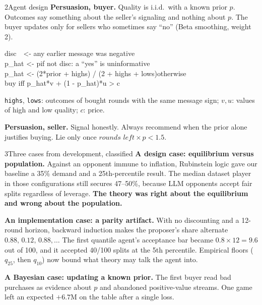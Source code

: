 \documentclass[10pt]{article}
\newcommand{\smallsize}{\fontsize{6.9}{8.9}\selectfont}
\newcommand{\lead}[1]{\textbf{\color{navy}#1}}
\begin{document}
{\begin{minipage}[t][295.3mm][t]{207.8mm}
\begin{minipage}[t]{0.485\linewidth}
\begin{panel}{2\quad Agent design}
\vspace{1.3mm}
\lead{Persuasion, buyer.} Quality is i.i.d.\ with a known prior $p$. Outcomes
say something about the seller's signaling and nothing about $p$. The buyer
updates only for sellers who sometimes say ``no'' (Beta smoothing, weight 2).
\begin{tcolorbox}[colback=paper, colframe=paper, arc=1mm, boxrule=0pt,
  left=2mm, right=2mm, top=1.1mm, bottom=1.1mm, before skip=1.4mm, after skip=0.4mm]
\fontsize{6.6}{8.6}\selectfont\ttfamily
disc\ \ <- any earlier message was negative\\
p\_hat <- p\hfill\textrm{\sffamily\color{muted}if not disc: a ``yes'' is uninformative}\\
p\_hat <- (2*prior + highs) / (2 + highs + lows)\hfill\textrm{\sffamily\color{muted}otherwise}\\
buy iff p\_hat*v + (1 - p\_hat)*u > c
\end{tcolorbox}
{\smallsize\color{muted}\texttt{highs}, \texttt{lows}: outcomes of bought rounds
with the same message sign; $v,u$: values of high and low quality; $c$: price.\par}

\vspace{1.3mm}
\lead{Persuasion, seller.} Signal honestly. Always recommend when the prior
alone justifies buying. Lie only once $\textit{rounds left}\times p<1.5$.
\end{panel}

\begin{panel}{3\quad Three cases from development, classified}
\lead{A design case: equilibrium versus population.} Against an opponent immune
to inflation, Rubinstein logic gave our baseline a 35\% demand and a
25th-percentile result. The median dataset player in those configurations still
secures 47--50\%, because LLM opponents accept fair splits regardless of
leverage. \textbf{The theory was right about the equilibrium and wrong about
the population.}

\vspace{1.3mm}
\lead{An implementation case: a parity artifact.} With no discounting and a
12-round horizon, backward induction makes the proposer's share alternate
$0.88,\,0.12,\,0.88,\dots$ The first quantile agent's acceptance bar became
$0.8\times12=9.6$ out of 100, and it accepted 40/100 splits at the 5th
percentile. Empirical floors ($q_{25}$, then $q_{10}$) now bound what theory may
talk the agent into.

\vspace{1.3mm}
\lead{A Bayesian case: updating a known prior.} The first buyer read bad
purchases as evidence about $p$ and abandoned positive-value streams. One game
left an expected $+6.7$M on the table after a single loss.
\end{panel}


\end{minipage}
\end{minipage}}
\end{document}
